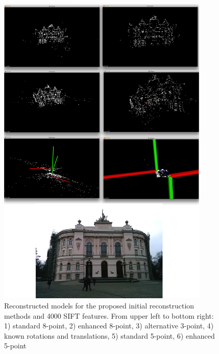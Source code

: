 \begin{figure}[p]
    \centering
    \includegraphics[width=0.9\textwidth]{uni4000Comparison}
    \caption[Reconstructed models for the proposed initial reconstruction methods and 4000 SIFT features]{Reconstructed models for the proposed initial reconstruction methods and 4000 SIFT features. From upper left to bottom right: 1) standard 8-point, 2) enhanced 8-point, 3) alternative 3-point, 4) known rotations and translations, 5) standard 5-point, 6) enhanced 5-point}
    \label{fig:uni4000Comparison}
\end{figure}
